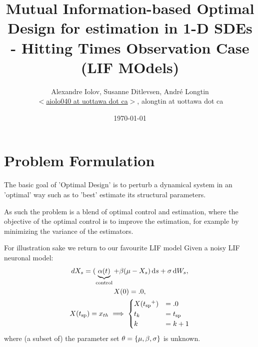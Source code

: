 \documentclass{article}
\begin{document}
\title{Mutual Information-based Optimal Design for estimation in 1-D SDEs -
Hitting Times Observation Case (LIF MOdels)} 
\author{Alexandre Iolov, Susanne Ditlevsen, Andr\'e Longtin  \\
$<$\href{mailto:aiolo040@uottawa.ca}
		{aiolo040 at uottawa dot ca}$>$, alongtin at uottawa dot ca}

\date{\today}

\maketitle  

 
\tableofcontents

\listoftables  

\listoffigures 

\section{Problem Formulation}
The basic goal of 'Optimal Design' is to perturb a dynamical system in an
'optimal' way such as to 'best' estimate its structural parameters. 

As such the problem is a blend of optimal control and estimation, where the
objective of the optimal control is to improve the estimation, for example by
minimizing the variance of the estimators. 

For illustration sake we return to our favourite LIF model
Given a noisy LIF neuronal model:
\begin{equation}
\begin{gathered}
dX_s = (\underbrace{\a(t)}_{\textrm{control}} + \b(\m %
 - {X_s} ) \intd{s} + \s\intd{W_s},
\\
X(0) = .0,
\\
X(\ts) = \xth \implies  
\begin{cases}
X(\ts^+) &= .0   
\\
t_k &=  \ts
\\
k  &= k+1
\end{cases}
\end{gathered}
\label{eq:X_evolution_uo}
\end{equation}
where (a subset of) the parameter set ${\theta} = \{{\mu }, {\beta}, {\sigma }\}$ is unknown.
\end{document}
